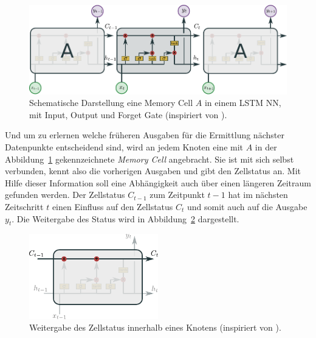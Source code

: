             \begin{figure}[ht]\label{fig:LSTM}
                \centering
                \includegraphics[width=1\textwidth]{images/Illustrationen/LSTM}
                \caption{Schematische Darstellung eine Memory Cell $A$ in einem LSTM NN, mit Input, Output und Forget Gate (inspiriert von \cite{OLAH2015}).}
            \end{figure}

            Und um zu erlernen welche früheren Ausgaben für die Ermittlung nächster Datenpunkte entscheidend sind,
            wird an jedem Knoten eine mit $A$ in der Abbildung~\ref{fig:LSTM} gekennzeichnete \textit{Memory Cell}  angebracht.
            Sie ist mit sich selbst verbunden, kennt also die vorherigen Ausgaben und gibt den Zellstatus an.
            Mit Hilfe dieser Information soll eine Abhängigkeit auch über einen längeren Zeitraum gefunden werden.
            Der Zellstatus $C_{t-1}$ zum Zeitpunkt $t-1$ hat im nächsten Zeitschritt $t$ einen Einfluss auf den Zellstatus $C_{t}$ und somit auch auf die Ausgabe $y_t$.
            Die Weitergabe des Status wird in Abbildung~\ref{fig:LSTM_Status} dargestellt.

                \begin{figure}[ht]
                    \centering
                    \includegraphics[width=0.5\textwidth]{images/Illustrationen/LSTM_MC}
                    \caption{Weitergabe des Zellstatus innerhalb eines Knotens (inspiriert von \cite{OLAH2015}).}
                    \label{fig:LSTM_Status}
                \end{figure}
                
